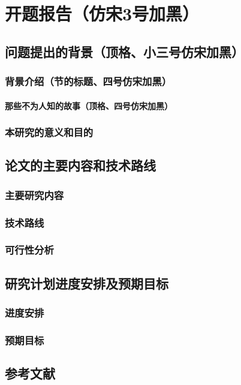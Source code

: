 \chapter{开题报告（仿宋3号加黑）}

\section{问题提出的背景（顶格、小三号仿宋加黑）}

\subsection{背景介绍（节的标题、四号仿宋加黑）}

\subsubsection{那些不为人知的故事（顶格、四号仿宋加黑）}

\subsection{本研究的意义和目的}

\section{论文的主要内容和技术路线}

\subsection{主要研究内容}

\subsection{技术路线}

\subsection{可行性分析}

\section{研究计划进度安排及预期目标}

\subsection{进度安排}

\subsection{预期目标}

\section{参考文献}